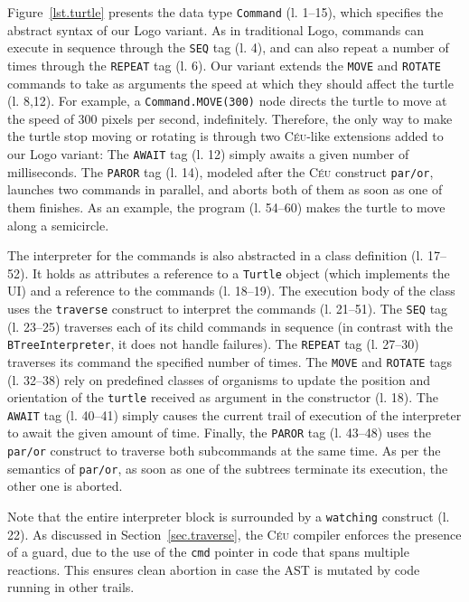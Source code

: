\documentclass{sig-alternate}
\newcommand{\CEU}{\textsc{C\'{e}u}\xspace}
\newcommand{\code}[1] {{\small{\texttt{#1}}}}
\begin{document}
Figure~\ref{lst.turtle} presents the data type \code{Command} (l. 1--15), 
which specifies the abstract syntax of our Logo variant.
As in traditional Logo, commands can execute in sequence through the \code{SEQ} 
tag (l. 4), and can also repeat a number of times through the \code{REPEAT} 
tag (l. 6).
%
Our variant extends the \code{MOVE} and \code{ROTATE} commands to take as 
arguments the speed at which they should affect the turtle (l. 8,12).
For example, a \code{Command.MOVE(300)} node directs the turtle to move at the 
speed of 300 pixels per second, indefinitely.
%
Therefore, the only way to make the turtle stop moving or rotating is through 
two \CEU-like extensions added to our Logo variant:
The \code{AWAIT} tag (l. 12) simply awaits a given number of milliseconds.
The \code{PAROR} tag (l. 14), modeled after the \CEU construct \code{par/or},
launches two commands in parallel, and aborts both of them as soon as one of
them finishes.
%
As an example, the program (l. 54--60) makes the turtle to move along a 
semicircle.

The interpreter for the commands is also abstracted in a class definition 
(l. 17--52).
%
It holds as attributes a reference to a \code{Turtle} object (which implements 
the UI) and a reference to the commands (l. 18--19).
The execution body of the class uses the \code{traverse} construct to interpret 
the commands (l. 21--51).
%
The \code{SEQ} tag (l. 23--25) traverses each of its child commands in 
sequence (in contrast with the \code{BTreeInterpreter}, it does not handle 
failures).
%
The \code{REPEAT} tag (l. 27--30) traverses its command the specified number 
of times.
%
The \code{MOVE} and \code{ROTATE} tags (l. 32--38) rely on 
predefined classes of organisms to update the position and orientation of the 
\code{turtle} received as argument in the constructor (l. 18).
%
The \code{AWAIT} tag (l. 40--41) simply causes the current trail of 
execution of the interpreter to await the given amount of time.
%
Finally, the \code{PAROR} tag (l. 43--48) uses the \code{par/or} construct
to traverse both subcommands at the same time. As per the semantics of
\code{par/or}, as soon as one of the subtrees terminate its execution,
the other one is aborted.

Note that the entire interpreter block is surrounded by a \code{watching}
construct (l. 22).
As discussed in Section~\ref{sec.traverse}, the \CEU compiler enforces the 
presence of a guard, due to the use of the \code{cmd} pointer in code that 
spans multiple reactions. This ensures clean abortion in case the AST is 
mutated by code running in other trails.
\end{document}
